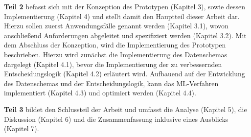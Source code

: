 \textbf{Teil 2} befasst sich mit der Konzeption des Prototypen (Kapitel 3), sowie dessen Implementierung (Kapitel 4) und stellt damit den Hauptteil dieser Arbeit dar. Hierzu sollen zuerst Anwendungsfälle genannt werden (Kapitel 3.1), wovon anschließend Anforderungen abgeleitet und spezifiziert werden (Kapitel 3.2). Mit dem Abschluss der Konzeption, wird die Implementierung des Prototypen beschrieben. Hierzu wird zunächst die Implementierung des Datenschemas dargelegt (Kapitel 4.1), bevor die Implementierung der zu verbessernden Entscheidungslogik (Kapitel 4.2) erläutert wird. Aufbauend auf der Entwicklung des Datenschemas und der Entscheidungslogik, kann das ML-Verfahren implementiert (Kapitel 4.3) und optimiert werden (Kapitel 4.4).        

\textbf{Teil 3} bildet den Schlussteil der Arbeit und umfasst die Analyse (Kapitel 5), die Diskussion (Kapitel 6) und die Zusammenfassung inklusive eines Ausblicks (Kapitel 7).

